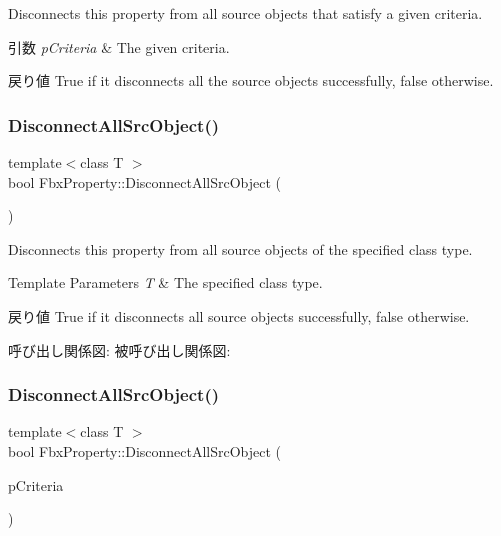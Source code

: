Disconnects this property from all source objects that satisfy a given criteria. 
\begin{DoxyParams}{引数}
{\em p\+Criteria} & The given criteria. \\
\hline
\end{DoxyParams}
\begin{DoxyReturn}{戻り値}
{\ttfamily True} if it disconnects all the source objects successfully, {\ttfamily false} otherwise. 
\end{DoxyReturn}
\mbox{\label{class_fbx_property_a70f1adf2711c5bd6f3d7c1f6f9c7ddf2}} 
\subsubsection{\texorpdfstring{Disconnect\+All\+Src\+Object()}{DisconnectAllSrcObject()}\hspace{0.1cm}{\footnotesize\ttfamily [3/4]}}
{\footnotesize\ttfamily template$<$class T $>$ \\
bool Fbx\+Property\+::\+Disconnect\+All\+Src\+Object (\begin{DoxyParamCaption}{ }\end{DoxyParamCaption})}

Disconnects this property from all source objects of the specified class type. 
\begin{DoxyTemplParams}{Template Parameters}
{\em T} & The specified class type. \\
\hline
\end{DoxyTemplParams}
\begin{DoxyReturn}{戻り値}
{\ttfamily True} if it disconnects all source objects successfully, {\ttfamily false} otherwise. 
\end{DoxyReturn}
呼び出し関係図\+:
被呼び出し関係図\+:
\mbox{\label{class_fbx_property_ab176817ac3ddc88c86d28006b066bc26}} 
\subsubsection{\texorpdfstring{Disconnect\+All\+Src\+Object()}{DisconnectAllSrcObject()}\hspace{0.1cm}{\footnotesize\ttfamily [4/4]}}
{\footnotesize\ttfamily template$<$class T $>$ \\
bool Fbx\+Property\+::\+Disconnect\+All\+Src\+Object (\begin{DoxyParamCaption}\item[{const \hyperlink{class_fbx_criteria}{Fbx\+Criteria} \&}]{p\+Criteria }\end{DoxyParamCaption})}

